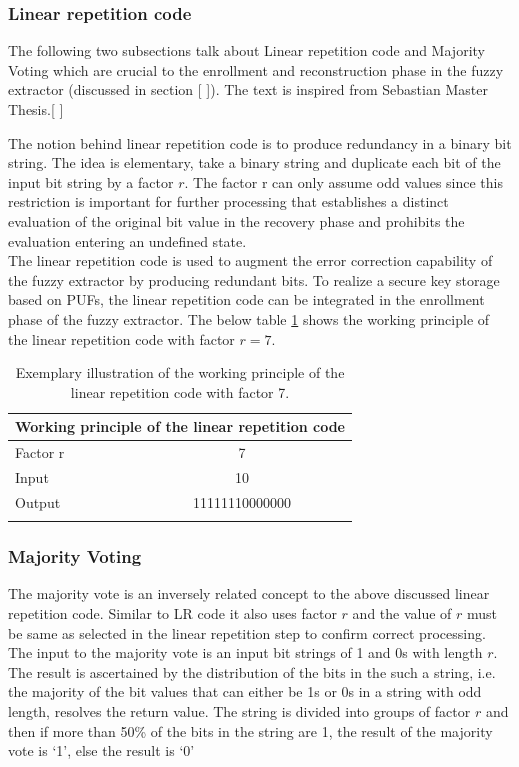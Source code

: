 \subsubsection{Linear repetition code}
\label{fzex_lr}
The following two subsections talk about Linear repetition code and Majority Voting which are crucial to the enrollment and reconstruction phase in the fuzzy extractor (discussed in section [ ]). The text is inspired from Sebastian Master Thesis.[ ]

The notion behind linear repetition code is to produce redundancy in a binary bit string. The idea is elementary, take a binary string and duplicate each bit of the input bit string by a factor $r$. The factor r can only assume odd values since this restriction is important for further processing that establishes a distinct evaluation of the original bit value in the recovery phase and prohibits the evaluation entering an undefined state.\\

The linear repetition code is used to augment the error correction capability of the fuzzy extractor by producing redundant bits. To realize a secure key storage based on PUFs, the linear repetition code can be integrated in the enrollment phase of the fuzzy extractor. The below table \ref{lr} shows the working principle of the linear repetition code with factor $r = 7$.

\begin{table}[!ht]
\begin{center}
\begin{tabular}{lc}
\toprule
\multicolumn{2}{c}{\textbf{Working principle of the linear repetition code}}\\
\midrule
Factor r & 7\\
Input & 10\\
Output & 11111110000000\\
\addlinespace
\bottomrule
\end{tabular}
\end{center}
\caption{Exemplary illustration of the working principle of the linear repetition code with factor 7.}
\label{lr}
\end{table}

\subsubsection{Majority Voting}
\label{fzex_mv}
The majority vote is an inversely related concept to the above discussed linear repetition code. Similar to LR code it also uses factor $r$ and the value of $r$ must be same as selected in the linear repetition step to confirm correct processing. The input to the majority vote is an input bit strings of 1 and 0s with length $r$. The result is ascertained by the distribution of the bits in the such a string, i.e. the majority of the bit values that can either be 1s or 0s in a string with odd
length, resolves the return value. The string is divided into groups of factor $r$ and then if more than 50\% of the bits in the string are 1, the result of the majority vote is `1', else the result is `0'\\

